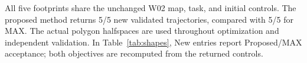 All five footprints share the unchanged W02 map, task, and initial controls. The proposed method returns 5/5 new validated trajectories, compared with 5/5 for MAX. The actual polygon halfspaces are used throughout optimization and independent validation.
In Table~\ref{tab:shapes}, New entries report Proposed/MAX acceptance; both objectives are recomputed from the returned controls.
